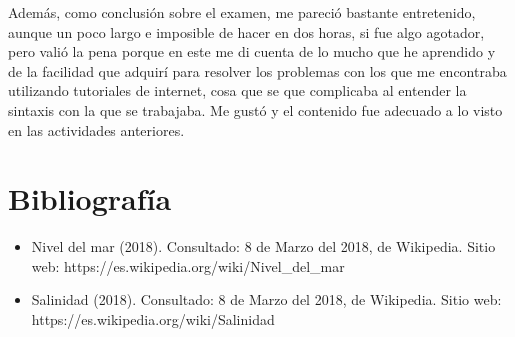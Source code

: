\documentclass[12pt]{article}
\begin{document}
Además, como conclusión sobre el examen, me pareció bastante entretenido, aunque un poco largo e imposible de hacer en dos horas, si fue algo agotador, pero valió la pena porque en este me di cuenta de lo mucho que he aprendido y de la facilidad que adquirí para resolver los problemas con los que me encontraba utilizando tutoriales de internet, cosa que se que complicaba al entender la sintaxis con la que se trabajaba. Me gustó y el contenido fue adecuado a lo visto en las actividades anteriores.

\section{Bibliografía}
\begin{itemize}
\item Nivel del mar (2018). Consultado: 8 de Marzo del 2018, de Wikipedia. Sitio web: https://es.wikipedia.org/wiki/Nivel\_del\_mar
\item Salinidad (2018). Consultado: 8 de Marzo del 2018, de Wikipedia. Sitio web:\\ https://es.wikipedia.org/wiki/Salinidad
\end{itemize}
\end{document}

